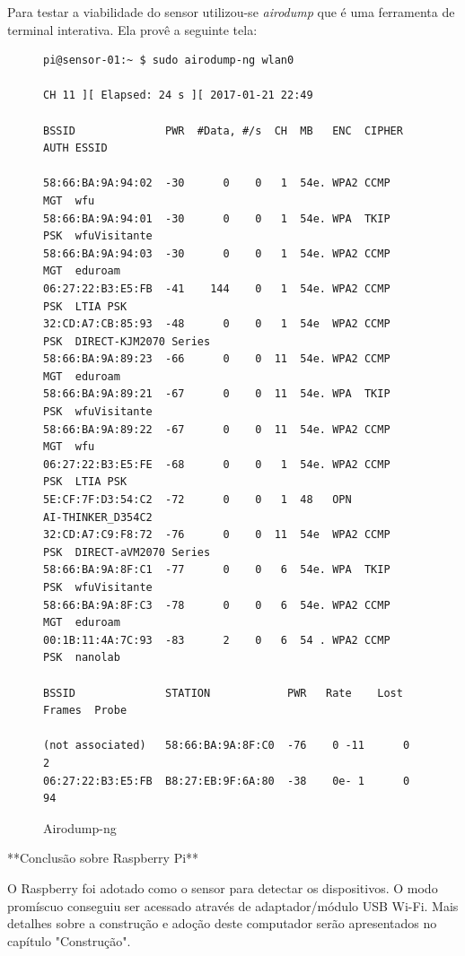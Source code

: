 Para testar a viabilidade do sensor utilizou-se \emph{airodump} que é uma
ferramenta de terminal interativa. Ela provê a seguinte tela:

\begin{figure}[htb]
	\caption{\label{fig-airodump}Airodump-ng}
	\begin{center}
		\begin{verbatim}
pi@sensor-01:~ $ sudo airodump-ng wlan0

CH 11 ][ Elapsed: 24 s ][ 2017-01-21 22:49

BSSID              PWR  #Data, #/s  CH  MB   ENC  CIPHER AUTH ESSID

58:66:BA:9A:94:02  -30      0    0   1  54e. WPA2 CCMP   MGT  wfu
58:66:BA:9A:94:01  -30      0    0   1  54e. WPA  TKIP   PSK  wfuVisitante
58:66:BA:9A:94:03  -30      0    0   1  54e. WPA2 CCMP   MGT  eduroam
06:27:22:B3:E5:FB  -41    144    0   1  54e. WPA2 CCMP   PSK  LTIA PSK
32:CD:A7:CB:85:93  -48      0    0   1  54e  WPA2 CCMP   PSK  DIRECT-KJM2070 Series
58:66:BA:9A:89:23  -66      0    0  11  54e. WPA2 CCMP   MGT  eduroam
58:66:BA:9A:89:21  -67      0    0  11  54e. WPA  TKIP   PSK  wfuVisitante
58:66:BA:9A:89:22  -67      0    0  11  54e. WPA2 CCMP   MGT  wfu
06:27:22:B3:E5:FE  -68      0    0   1  54e. WPA2 CCMP   PSK  LTIA PSK
5E:CF:7F:D3:54:C2  -72      0    0   1  48   OPN              AI-THINKER_D354C2
32:CD:A7:C9:F8:72  -76      0    0  11  54e  WPA2 CCMP   PSK  DIRECT-aVM2070 Series
58:66:BA:9A:8F:C1  -77      0    0   6  54e. WPA  TKIP   PSK  wfuVisitante
58:66:BA:9A:8F:C3  -78      0    0   6  54e. WPA2 CCMP   MGT  eduroam
00:1B:11:4A:7C:93  -83      2    0   6  54 . WPA2 CCMP   PSK  nanolab

BSSID              STATION            PWR   Rate    Lost    Frames  Probe

(not associated)   58:66:BA:9A:8F:C0  -76    0 -11      0        2
06:27:22:B3:E5:FB  B8:27:EB:9F:6A:80  -38    0e- 1      0       94

		\end{verbatim}
	\end{center}
\end{figure}


**Conclusão sobre Raspberry Pi**

O Raspberry foi adotado como o sensor para detectar os dispositivos. O modo
promíscuo conseguiu ser acessado através de adaptador/módulo USB Wi-Fi. Mais
detalhes sobre a construção e adoção deste computador serão apresentados no
capítulo "Construção".

